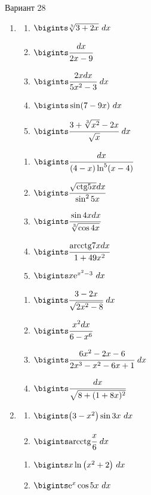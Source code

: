 \documentclass{article}
\begin{document}
\begin{multicols}{2}
	\centerline{Вариант 28}
	\begin{enumerate}[label=\Roman*.]
		\item
		\begin{multicols}{3}
			\begin{enumerate}[label=\arabic*.]
				\setlength\itemsep{1em}
				\item $\bigints\sqrt[5]{3+2x}\ dx$
				\item $\bigints\cfrac{dx}{2x-9}$
				\item $\bigints\cfrac{2xdx}{5x^2-3}\ dx$
				\item $\bigints\sin(7-9x)\ dx$
				\item $\bigints\cfrac{3+\sqrt[3]{x^2}-2x}{\sqrt{x}}\ dx$
			\end{enumerate}
			\vfill\null\columnbreak
			\begin{enumerate}[label=\arabic*. , start=6]
				\setlength\itemsep{1em}
				\item $\bigints\cfrac{dx}{(4-x)\ln^5(x-4)}$
				\item $\bigints\cfrac{\sqrt{\mbox{ctg}5x}dx}{\sin^25x}$
				\item $\bigints\cfrac{\sin 4xdx}{\sqrt[3]{\cos 4x}}$
				\item $\bigints\cfrac{\mbox{arcctg}7xdx}{1+49x^2}$
				\item $\bigints x\mbox{e}^{x^2-3}\ dx$
			\end{enumerate}
			\vfill\null\columnbreak
			\begin{enumerate}[label=\arabic*. , start=11]
				\setlength\itemsep{1em}
				\item $\bigints\cfrac{3-2x}{\sqrt{2x^2-8}}\ dx$
				\item $\bigints\cfrac{x^2dx}{6-x^6}$
				\item $\bigints\cfrac{6x^2-2x-6}{2x^3-x^2-6x+1}\ dx$
				\item $\bigints\cfrac{dx}{\sqrt{8+(1+8x)^2}}$
			\end{enumerate}
			\vfill\null\columnbreak
		\end{multicols}
		
		\item
		\begin{multicols}{3}
			\begin{enumerate}[label=\arabic*.]
				\setlength\itemsep{1em}
				\item $\bigints\big(3-x^2\big)\sin 3x\ dx$
				\item $\bigints\mbox{arcctg}\cfrac{x}{6}\ dx$
			\end{enumerate}
			\vfill\null\columnbreak
			\begin{enumerate}[label=\arabic*., start=3]
				\setlength\itemsep{1em}
				\item $\bigints x\ln\big(x^2 + 2\big)\ dx$
				\item $\bigints\mbox{e}^{x}\cos 5x\ dx$
			\end{enumerate}
			\vfill\null\columnbreak
			\vfill\null\columnbreak
		\end{multicols}
		

\end{enumerate}
\end{multicols}
\end{document}
